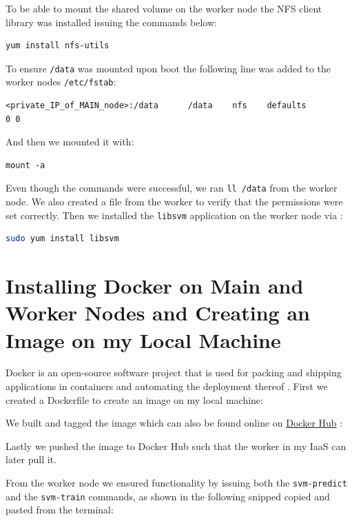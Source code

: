 \documentclass{article}
\begin{document}
To be able to mount the shared volume on the worker node the NFS client library was installed issuing the commands below:
\begin{lstlisting}[language=bash]
yum install nfs-utils
\end{lstlisting}

To ensure \texttt{/data} was mounted upon boot the following line was added to the worker nodes \texttt{/etc/fstab}:
\begin{lstlisting}
<private_IP_of_MAIN_node>:/data      /data    nfs    defaults                0 0
\end{lstlisting}
And then we mounted it with:
\begin{lstlisting}
mount -a
\end{lstlisting}

Even though the commands were successful, we ran \texttt{ll /data} from the worker node. We also created a file from the worker to verify that the permissions were set correctly.
Then we installed the \texttt{libsvm} application on the worker node via \cite{chang_libsvm_2011}:
\begin{lstlisting}[language=bash]
sudo yum install libsvm
\end{lstlisting}

\section{Installing Docker on Main and Worker Nodes and Creating an Image on my Local Machine}
Docker is an open-source software project that is used for packing and shipping applications in containers and automating the deployment thereof \cite{merkel2014docker, noauthor_docker_nodate}.
First we created a Dockerfile to create an image on my local machine:

We built and tagged the image which can also be found online on \href{https://hub.docker.com/r/ilante/centos8_libsvm}{Docker Hub} \cite{noauthor_docker_nodate}:

Lastly we pushed the image to Docker Hub such that the worker in my IaaS can later pull it.


From the worker node we ensured functionality by issuing both the \texttt{svm-predict} and the \texttt{svm-train} commands, as shown in the following snipped copied and pasted from the terminal:

\newpage
\end{document}
